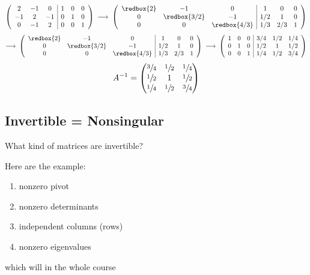 \[
\left(
\begin{array}{ccc|ccc}
2 & -1 & 0 & 1 & 0 & 0 \\
-1 & 2 & -1 & 0 & 1 & 0 \\
0 & -1 & 2 & 0 & 0 & 1
\end{array}
\right) \;\longrightarrow\; \left(
\begin{array}{ccc|ccc}
\redbox{2} & -1 & 0 & 1 & 0 & 0 \\
0 & \redbox{3/2} & -1 & 1/2 & 1 & 0 \\
0 & 0 & \redbox{4/3} & 1/3 & 2/3 & 1
\end{array}
\right)
\]
\vspace{1em}
\[
\longrightarrow \; \left(
\begin{array}{ccc|ccc}
\redbox{2} & -1 & 0 & 1 & 0 & 0 \\
0 & \redbox{3/2} & -1 & 1/2 & 1 & 0 \\
0 & 0 & \redbox{4/3} & 1/3 & 2/3 & 1
\end{array}
\right)
\;\longrightarrow\;
\left(
\begin{array}{ccc|ccc}
1 & 0 & 0 & 3/4 & 1/2 & 1/4 \\
0 & 1 & 0 & 1/2 & 1 & 1/2 \\
0 & 0 & 1 & 1/4 & 1/2 & 3/4
\end{array}
\right)
\]
\vspace{1em}
\[
A^{-1} = \begin{pmatrix}
\sfrac{3}{4} & \sfrac{1}{2} & \sfrac{1}{4} \\
\sfrac{1}{2} & 1 & \sfrac{1}{2} \\
\sfrac{1}{4} & \sfrac{1}{2} & \sfrac{3}{4}
\end{pmatrix}
\]

\newpage

\subsection{Invertible = Nonsingular}

\begin{exercise}
What kind of matrices are invertible?
\end{exercise}
\begin{answer}
Here are the example:
\begin{enumerate}[$\arabic*^\circ$]
    \item nonzero pivot  
    \item nonzero determinants 
    \item independent columns (rows) 
    \item nonzero eigenvalues 
\end{enumerate}
which will in the whole course 
\end{answer}

